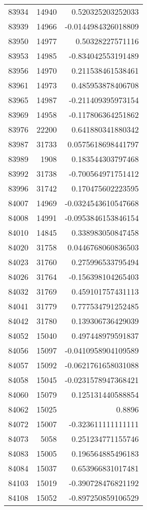 \begin{tabular}{r | r | r}
83934 & 14940 & 0.520325203252033 \\
83939 & 14966 & -0.0144984326018809 \\
83950 & 14977 & 0.50328227571116 \\
83953 & 14985 & -0.834042553191489 \\
83956 & 14970 & 0.211538461538461 \\
83961 & 14973 & 0.485953878406708 \\
83965 & 14987 & -0.211409395973154 \\
83969 & 14958 & -0.117806364251862 \\
83976 & 22200 & 0.641880341880342 \\
83987 & 31733 & 0.0575618698441797 \\
83989 & 1908 & 0.183544303797468 \\
83992 & 31738 & -0.700564971751412 \\
83996 & 31742 & 0.170475602223595 \\
84007 & 14969 & -0.0324543610547668 \\
84008 & 14991 & -0.0953846153846154 \\
84010 & 14845 & 0.338983050847458 \\
84020 & 31758 & 0.0446768060836503 \\
84023 & 31760 & 0.275996533795494 \\
84026 & 31764 & -0.156398104265403 \\
84032 & 31769 & 0.459101757431113 \\
84041 & 31779 & 0.777534791252485 \\
84042 & 31780 & 0.139306736429039 \\
84052 & 15040 & 0.497448979591837 \\
84056 & 15097 & -0.0410958904109589 \\
84057 & 15092 & -0.0621761658031088 \\
84058 & 15045 & -0.0231578947368421 \\
84060 & 15079 & 0.125131440588854 \\
84062 & 15025 & 0.8896 \\
84072 & 15007 & -0.323611111111111 \\
84073 & 5058 & 0.251234771155746 \\
84083 & 15005 & 0.196564885496183 \\
84084 & 15037 & 0.653966831017481 \\
84103 & 15019 & -0.390728476821192 \\
84108 & 15052 & -0.897250859106529 \\

\end{tabular}
